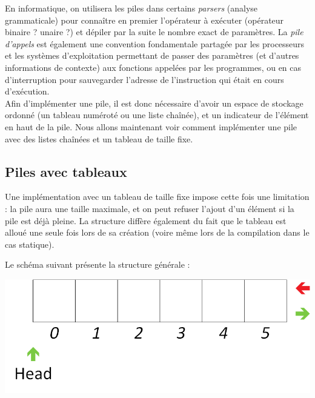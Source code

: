 \documentclass[11pt,a4paper]{article}
\begin{document}
En informatique, on utilisera les piles dans certains \textit{parsers} (analyse grammaticale) pour connaître en premier l'opérateur à exécuter (opérateur binaire ? unaire ?) et dépiler par la suite le nombre exact de paramètres.
La \textit{pile d'appels} est également une convention fondamentale partagée par les processeurs et les systèmes d'exploitation permettant de passer des paramètres (et d'autres informations de contexte) aux fonctions appelées par les programmes, ou en cas d'interruption pour sauvegarder l'adresse de l'instruction qui était en cours d'exécution.\\

Afin d'implémenter une pile, il est donc nécessaire d'avoir un espace de stockage ordonné (un tableau numéroté ou une liste chaînée), et un indicateur de l'élément en haut de la pile.
Nous allons maintenant voir comment implémenter une pile avec des listes chaînées et un tableau de taille fixe.

\bigskip


\subsection{Piles avec tableaux}

\bigskip

Une implémentation avec un tableau de taille fixe impose cette fois une limitation : la pile aura une taille maximale, et on peut refuser l'ajout d'un élément si la pile est déjà pleine.
La structure diffère également du fait que le tableau est alloué une seule fois lors de sa création (voire même lors de la compilation dans le cas statique).

Le schéma suivant présente la structure générale :\\

\begin{center}
\includegraphics[scale=1]{img/piles/Piles_5_Tableau_Statique_Structure.png}
\end{center}
\end{document}
